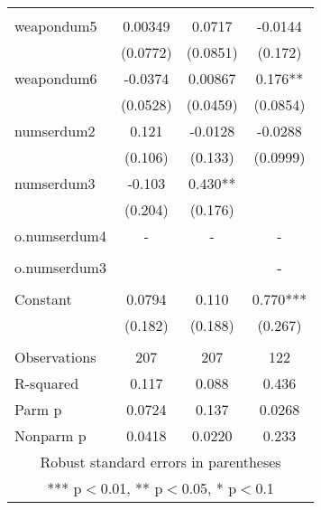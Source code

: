 \documentclass[]{article}
\begin{document}
\begin{tabular}{lccc}
 &  &  &  \\
weapondum5 & 0.00349 & 0.0717 & -0.0144 \\
 & (0.0772) & (0.0851) & (0.172) \\
weapondum6 & -0.0374 & 0.00867 & 0.176** \\
 & (0.0528) & (0.0459) & (0.0854) \\
numserdum2 & 0.121 & -0.0128 & -0.0288 \\
 & (0.106) & (0.133) & (0.0999) \\
numserdum3 & -0.103 & 0.430** &  \\
 & (0.204) & (0.176) &  \\
o.numserdum4 & - & - & - \\
 &  &  &  \\
o.numserdum3 &  &  & - \\
 &  &  &  \\
Constant & 0.0794 & 0.110 & 0.770*** \\
 & (0.182) & (0.188) & (0.267) \\
 &  &  &  \\
Observations & 207 & 207 & 122 \\
R-squared & 0.117 & 0.088 & 0.436 \\
Parm p & 0.0724 & 0.137 & 0.0268 \\
 Nonparm p & 0.0418 & 0.0220 & 0.233 \\ \hline
\multicolumn{4}{c}{ Robust standard errors in parentheses} \\
\multicolumn{4}{c}{ *** p$<$0.01, ** p$<$0.05, * p$<$0.1} \\
\end{tabular}
\end{document}
